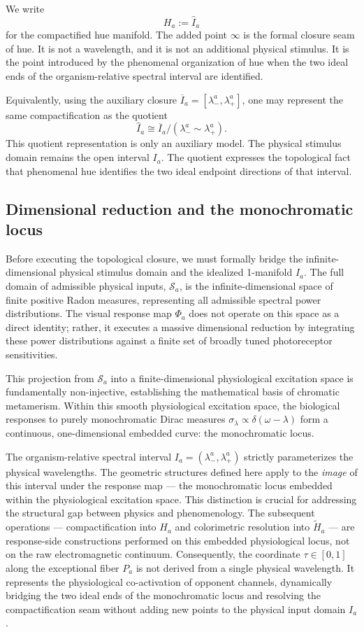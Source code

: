 \documentclass[preprint,12pt,authoryear]{elsarticle}
\theoremstyle{plain}
\theoremstyle{definition}
\theoremstyle{remark}
\begin{document}
We write
\[
H_a:=\widehat I_a
\]
for the compactified hue manifold. The added point $\infty$ is the formal closure seam of hue. It is not a wavelength, and it is not an additional physical stimulus. It is the point introduced by the phenomenal organization of hue when the two ideal ends of the organism-relative spectral interval are identified.

Equivalently, using the auxiliary closure $\overline I_a=[\lambda_-^a,\lambda_+^a]$, one may represent the same compactification as the quotient
\[
\widehat I_a\cong \overline I_a/(\lambda_-^a\sim\lambda_+^a).
\]
This quotient representation is only an auxiliary model. The physical stimulus domain remains the open interval $I_a$. The quotient expresses the topological fact that phenomenal hue identifies the two ideal endpoint directions of that interval.

\subsection{Dimensional reduction and the monochromatic locus}
\label{subsec:dimensional-reduction}

\noindent Before executing the topological closure, we must formally bridge the infinite-dimensional physical stimulus domain and the idealized 1-manifold $I_a$. The full domain of admissible physical inputs, $\mathcal{S}_a$, is the infinite-dimensional space of finite positive Radon measures, representing all admissible spectral power distributions. The visual response map $\Phi_a$ does not operate on this space as a direct identity; rather, it executes a massive dimensional reduction by integrating these power distributions against a finite set of broadly tuned photoreceptor sensitivities.

This projection from $\mathcal{S}_a$ into a finite-dimensional physiological excitation space is fundamentally non-injective, establishing the mathematical basis of chromatic metamerism. Within this smooth physiological excitation space, the biological responses to purely monochromatic Dirac measures $\sigma_\lambda\propto\delta(\omega-\lambda)$ form a continuous, one-dimensional embedded curve: the monochromatic locus.

The organism-relative spectral interval $I_a=(\lambda_-^a,\lambda_+^a)$ strictly parameterizes the physical wavelengths. The geometric structures defined here apply to the \emph{image} of this interval under the response map --- the monochromatic locus embedded within the physiological excitation space. This distinction is crucial for addressing the structural gap between physics and phenomenology. The subsequent operations --- compactification into $H_a$ and colorimetric resolution into $\widetilde H_a$ --- are response-side constructions performed on this embedded physiological locus, not on the raw electromagnetic continuum. Consequently, the coordinate $\tau\in[0,1]$ along the exceptional fiber $P_a$ is not derived from a single physical wavelength. It represents the physiological co-activation of opponent channels, dynamically bridging the two ideal ends of the monochromatic locus and resolving the compactification seam without adding new points to the physical input domain $I_a$.
\end{document}
